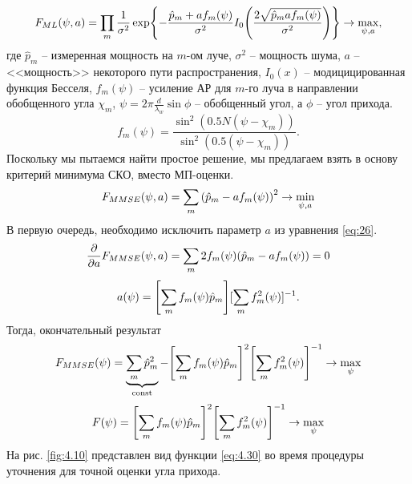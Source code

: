 \begin{equation}
    F_{ML}(\psi, a) = \prod\limits_m \frac{1}{\sigma^2}
    \exp{-\frac{\hat p_m + a f_m(\psi)}{\sigma^2}
        I_0\qty(\frac{2\sqrt{\hat p_m a f_m(\psi)}}{\sigma^2})} \to \max_{\psi, a},
\end{equation}
где $\hat p_m$ -- измеренная мощность на $m$-ом луче, $\sigma^2$ -- мощность
шума, $a$ -- <<мощность>> некоторого пути распространения, $I_0(x)$ --
модицицированная функция Бесселя, $f_m(\psi)$ -- усиление АР для $m$-го луча в
направлении обобщенного угла $\chi_m$, $\psi = 2\pi \frac{d}{\lambda_w}\sin
    \phi$ -- обобщенный угол, а $\phi$ -- угол прихода.
\begin{equation}
    f_m(\psi) = \frac{\sin^2 (0.5N(\psi - \chi_m))}{\sin^2(0.5(\psi - \chi_m))}.
\end{equation}
Поскольку мы пытаемся найти простое решение, мы предлагаем взять в основу
критерий минимума СКО, вместо МП-оценки.
\begin{equation}
    \label{eq:26}
    F_{MMSE}(\psi, a) = \sum\limits_m \qty(\hat p_m - a f_m(\psi))^2 \to \min_{\psi,a}
\end{equation}
В первую очередь, необходимо исключить параметр $a$ из уравнения \eqref{eq:26}.
\begin{equation}
    \pdv{a} F_{MMSE}(\psi, a) = \sum\limits_m 2f_m(\psi) (\hat p_m - a f_m(\psi)) = 0
\end{equation}
\begin{equation}
    a(\psi) = \qty[\sum\limits_m f_m(\psi) \hat p_m][\sum\limits_m f_m^2(\psi)]^{-1}.
\end{equation}
Тогда, окончательный результат
\begin{equation}
    F_{MMSE}(\psi)=\underbrace{\sum\limits_m \hat p_m^2}_{\text{const}} - \qty[\sum\limits_m f_m(\psi) \hat p_m]^2 \qty[\sum \limits_m f_m^2 (\psi)]^{-1} \to \max_{\psi}
\end{equation}
\begin{equation}
    \label{eq:4.30}
    F(\psi)=\qty[\sum\limits_m f_m(\psi) \hat p_m]^2 \qty[\sum \limits_m f_m^2 (\psi)]^{-1} \to \max_{\psi}
\end{equation}
На рис. \ref{fig:4.10} представлен вид функции \eqref{eq:4.30} во время процедуры уточнения для точной оценки угла прихода.

